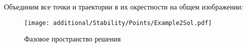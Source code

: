 		Объединим все точки и траектории в их окрестности на общем изображении:
		\begin{figure}[H]
			\centering
			\texttt{[image: additional/Stability/Points/Example2Sol.pdf]}
			\caption{Фазовое пространство решения}
			\label{Stability:Example2Sol}
		\end{figure}

